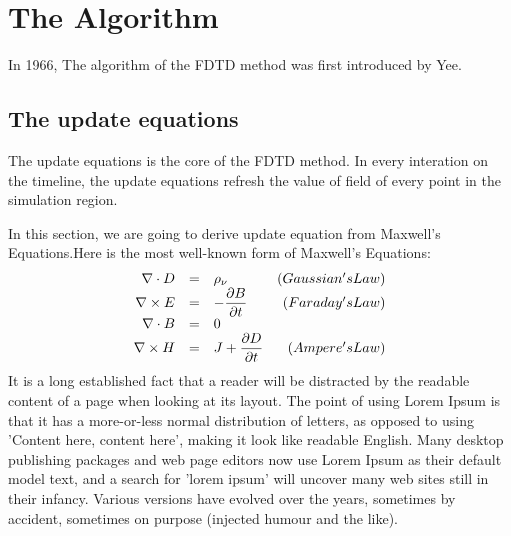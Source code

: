 \section{The Algorithm}

In 1966, The algorithm of the FDTD method was first introduced by Yee.

\subsection{The update equations}

The update equations is the core of the FDTD method. In every interation on the timeline, the update equations refresh
the value of field of every point in the simulation region.

In this section, we are going to derive update equation from Maxwell's Equations.Here is the most well-known form of
Maxwell's Equations:
\begin{gather}
  \label{eq:maxwell}
  \begin{array}{@{}rclr@{}}
    \nabla \cdot D & = & \rho_{\nu} & (Gaussian's Law)\\
    \nabla \times E & = & {\displaystyle -\frac{\partial B}{\partial t}} & (Faraday's Law)\\
    \nabla \cdot B & = & 0 & \\
    \nabla \times H & = & {\displaystyle J + \frac{\partial D}{\partial t}} & (Ampere's Law)
  \end{array}
\end{gather}
It is a long established fact that a reader will be distracted by the readable content of a page when looking at its
layout. The point of using Lorem Ipsum is that it has a more-or-less normal distribution of letters, as opposed to using
'Content here, content here', making it look like readable English. Many desktop publishing packages and web page
editors now use Lorem Ipsum as their default model text, and a search for 'lorem ipsum' will uncover many web sites
still in their infancy. Various versions have evolved over the years, sometimes by accident, sometimes on purpose
(injected humour and the like).


